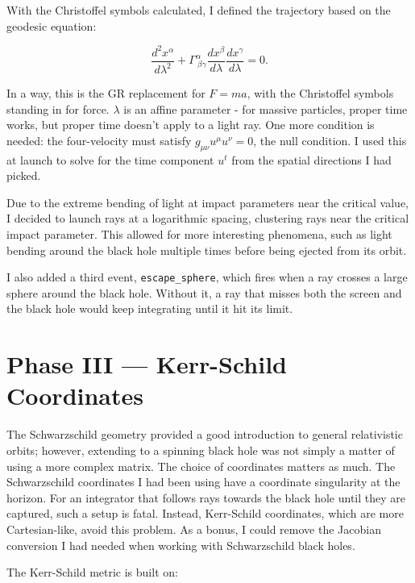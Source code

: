 \documentclass[11pt,a4paper]{article}
\begin{document}
With the Christoffel symbols calculated, I defined the trajectory based on the geodesic equation:

\begin{equation}
\frac{d^2x^{\alpha}}{d\lambda^2} + \Gamma^{\alpha}_{\ \beta\gamma}
\frac{dx^{\beta}}{d\lambda}\frac{dx^{\gamma}}{d\lambda} = 0.
\label{eq:geodesic}
\end{equation}

In a way, this is the GR replacement for $F=ma$, with the Christoffel symbols standing in for force. $\lambda$ is an affine parameter - for massive particles, proper time works, but proper time doesn't apply to a light ray. One more condition is needed: the four-velocity must satisfy $g_{\mu\nu}u^{\mu}u^{\nu} = 0$, the null condition. I used this at launch to solve for the time component $u^t$ from the spatial directions I had picked.

Due to the extreme bending of light at impact parameters near the critical value, I decided to launch rays at a logarithmic spacing, clustering rays near the critical impact parameter. This allowed for more interesting phenomena, such as light bending around the black hole multiple times before being ejected from its orbit.

I also added a third event, \texttt{escape\_sphere}, which fires when a ray crosses a large sphere around the black hole. Without it, a ray that misses both the screen and the black hole would keep integrating until it hit its limit.

\section{Phase III — Kerr-Schild Coordinates}
\label{sec:kerr}
The Schwarzschild geometry provided a good introduction to general relativistic orbits; however, extending to a spinning black hole was not simply a matter of using a more complex matrix. The choice of coordinates matters as much. The Schwarzschild coordinates I had been using have a coordinate singularity at the horizon. For an integrator that follows rays towards the black hole until they are captured, such a setup is fatal. Instead, Kerr-Schild coordinates, which are more Cartesian-like, avoid this problem. As a bonus, I could remove the Jacobian conversion I had needed when working with Schwarzschild black holes.

The Kerr-Schild metric is built on:
\end{document}
